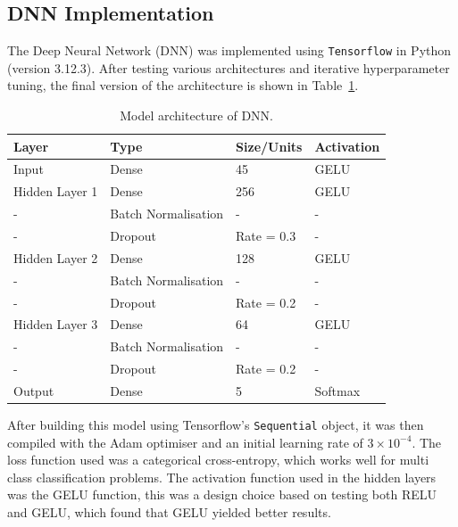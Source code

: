 \documentclass[11pt,a4paper]{article}
\begin{document}
\subsection{DNN Implementation}
The Deep Neural Network (DNN) was implemented using \texttt{Tensorflow} in Python (version 3.12.3). After testing various architectures and iterative hyperparameter tuning, the final version of the architecture is shown in Table~\ref{tab:ModelArchitecture}.
\begin{table}[H]
    \centering
    \begin{tabular}{|l|l|l|l|}
        \hline
        \textbf{Layer} & \textbf{Type}       & \textbf{Size/Units} & \textbf{Activation} \\ \hline
        Input          & Dense               & 45                  & GELU                \\ \hline
        Hidden Layer 1 & Dense               & 256                 & GELU                \\ \hline
        -              & Batch Normalisation & -                   & -                   \\ \hline
        -              & Dropout             & Rate = 0.3          & -                   \\ \hline
        Hidden Layer 2 & Dense               & 128                 & GELU                \\ \hline
        -              & Batch Normalisation & -                   & -                   \\ \hline
        -              & Dropout             & Rate = 0.2          & -                   \\ \hline
        Hidden Layer 3 & Dense               & 64                  & GELU                \\ \hline
        -              & Batch Normalisation & -                   & -                   \\ \hline
        -              & Dropout             & Rate = 0.2          & -                   \\ \hline
        Output         & Dense               & 5                   & Softmax             \\ \hline
    \end{tabular}
    \caption{Model architecture of DNN.}
    \label{tab:ModelArchitecture}
\end{table}
After building this model using Tensorflow’s \texttt{Sequential} object, it was then compiled with the Adam optimiser and an initial learning rate of $3\times 10^{-4}$. The loss function used was a categorical cross-entropy, which works well for multi class classification problems. The activation function used in the hidden layers was the GELU function, this was a design choice based on testing both RELU and GELU, which found that GELU yielded better results.
\end{document}
